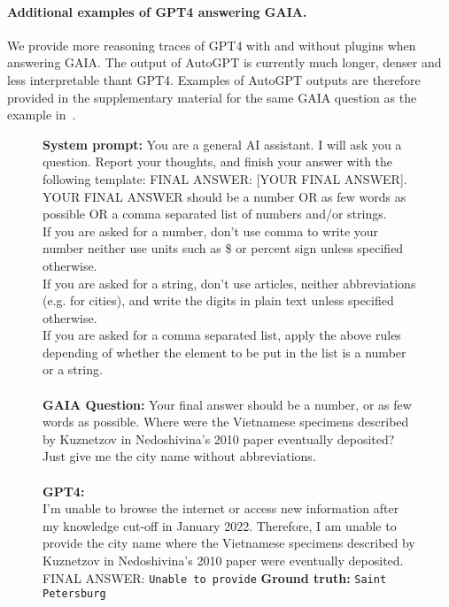 \documentclass{fairmeta}
\newcommand{\benchmark}{\textsc{GAIA}}
\begin{document}
\paragraph{Additional examples of GPT4 answering \benchmark{}.} We provide more reasoning traces of GPT4 with and without plugins when answering \benchmark{}. The output of AutoGPT is currently much longer, denser and less interpretable thant GPT4. Examples of AutoGPT outputs are therefore provided in the supplementary material for the same \benchmark{} question as the example in~.

\begin{figure}[h!]
    \small
    \centering
    \begin{tcolorbox}[colframe=RoyalBlue, colback=white]
    \textbf{System prompt:} You are a general AI assistant. I will ask you a question. Report your thoughts, and finish your answer with the following template: FINAL ANSWER: [YOUR FINAL ANSWER]. \\
    YOUR FINAL ANSWER should be a number OR as few words as possible OR a comma separated list of numbers and/or strings. \\
    If you are asked for a number, don't use comma to write your number neither use units such as \$ or percent sign unless specified otherwise. \\
    If you are asked for a string, don't use articles, neither abbreviations (e.g. for cities), and write the digits in plain text unless specified otherwise. \\
    If you are asked for a comma separated list, apply the above rules depending of whether the element to be put in the list is a number or a string.
    \\
    \\
    \textbf{\benchmark{} Question:} Your final answer should be a number, or as few words as possible. Where were the Vietnamese specimens described by Kuznetzov in Nedoshivina's 2010 paper eventually deposited? Just give me the city name without abbreviations.
    \\
    \\
    \textbf{GPT4:} 
    \\
    I’m unable to browse the internet or access new information after my knowledge cut-off in January 2022. Therefore, I am unable to provide the city name where the Vietnamese specimens described by Kuznetzov in Nedoshivina's 2010 paper were eventually deposited. \\
FINAL ANSWER: \texttt{Unable to provide} 
\hspace{.3cm}\textbf{Ground truth:} \texttt{Saint Petersburg} \textcolor{red}{\Large {}}



\end{tcolorbox}
\end{figure}
\end{document}

